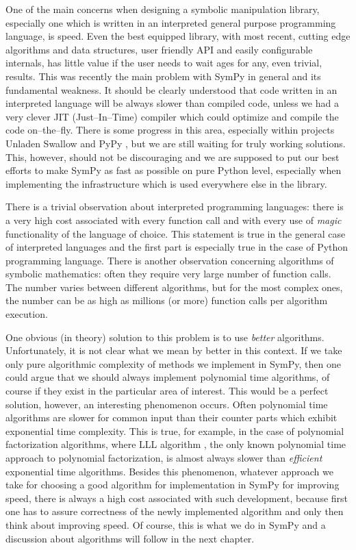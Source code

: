 One of the main concerns when designing a symbolic manipulation library, especially one which is
written in an interpreted general purpose programming language, is speed. Even the best equipped
library, with most recent, cutting edge algorithms and data structures, user friendly API and
easily configurable internals, has little value if the user needs to wait ages for any, even
trivial, results. This was recently the main problem with SymPy in general and its fundamental
weakness. It should be clearly understood that code written in an interpreted language will be
always slower than compiled code, unless we had a very clever JIT (Just--In--Time) compiler which
could optimize and compile the code on--the--fly. There is some progress in this area, especially
within projects Unladen Swallow \cite{UnladenSwallow} and PyPy \cite{PyPy}, but we are still waiting for
truly working solutions. This, however, should not be discouraging and we are supposed to put our
best efforts to make SymPy as fast as possible on pure Python level, especially when implementing
the infrastructure which is used everywhere else in the library.

There is a trivial observation about interpreted programming languages: there is a very high cost
associated with every function call and with every use of \emph{magic} functionality of the language of
choice. This statement is true in the general case of interpreted languages and the first part is
especially true in the case of Python programming language. There is another observation concerning
algorithms of symbolic mathematics: often they require very large number of function calls. The number
varies between different algorithms, but for the most complex ones, the number can be as high as millions
(or more) function calls per algorithm execution.

One obvious (in theory) solution to this problem is to use \emph{better} algorithms. Unfortunately, it
is not clear what we mean by better in this context. If we take only pure algorithmic complexity
of methods we implement in SymPy, then one could argue that we should always implement polynomial
time algorithms, of course if they exist in the particular area of interest. This would be a perfect
solution, however, an interesting phenomenon occurs. Often polynomial time algorithms are slower for
common input than their counter parts which exhibit exponential time complexity. This is true, for
example, in the case of polynomial factorization algorithms, where LLL algorithm \cite{Lenstra1982factor},
the only known polynomial time approach to polynomial factorization, is almost always slower than
\emph{efficient} exponential time algorithms. Besides this phenomenon, whatever approach we take for choosing
a good algorithm for implementation in SymPy for improving speed, there is always a high cost associated
with such development, because first one has to assure correctness of the newly implemented algorithm and
only then think about improving speed. Of course, this is what we do in SymPy and a discussion about
algorithms will follow in the next chapter.

